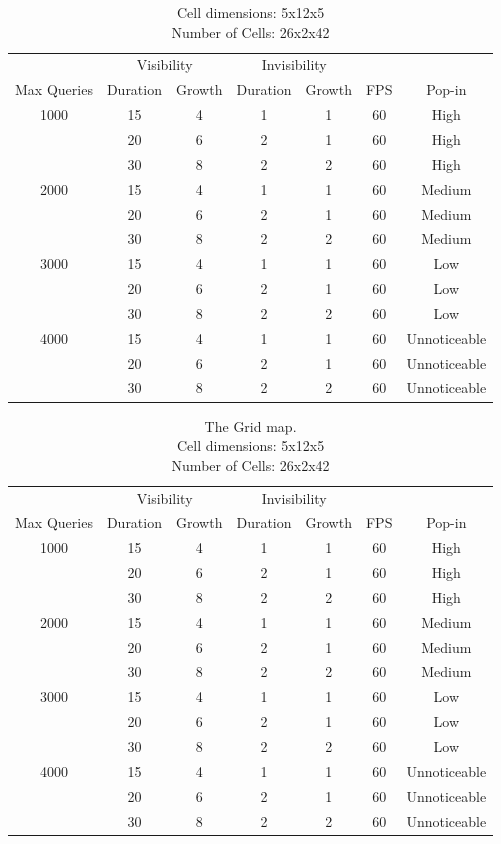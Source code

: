 \documentclass[12pt]{ucthesis}
\newcommand{\captionfonts}{\small\bf\ssp}
\begin{document}
\begin{table}
\begin{center}
\begin{tabular}{|c|c|c|c|c|c|c|}
\hline 
&\multicolumn{2}{c|}{Visibility}&\multicolumn{2}{c|}{Invisibility}&&
\tabularnewline
Max Queries&Duration&Growth&Duration&Growth&FPS&Pop-in
\tabularnewline
\hline
1000 & 15& 4& 1& 1& 60& High
\tabularnewline
& 20& 6& 2& 1& 60& High
\tabularnewline
& 30& 8& 2& 2& 60& High
\tabularnewline \hline
2000 & 15& 4& 1& 1& 60& Medium
\tabularnewline
& 20& 6& 2& 1& 60& Medium
\tabularnewline
& 30& 8& 2& 2& 60& Medium
\tabularnewline \hline
3000 & 15& 4& 1& 1& 60& Low
\tabularnewline
& 20& 6& 2& 1& 60& Low
\tabularnewline
& 30& 8& 2& 2& 60& Low
\tabularnewline \hline 
4000 & 15& 4& 1& 1& 60& Unnoticeable
\tabularnewline 
& 20& 6& 2& 1& 60& Unnoticeable
\tabularnewline
& 30& 8& 2& 2& 60& Unnoticeable
\tabularnewline \hline 
\end{tabular}
\captionfonts
\caption[Performance for The Grid]{Cell dimensions: 5x12x5\\Number of Cells: 26x2x42}
\label{table:the-grid-performance-a}
\end{center}
\end{table}

\begin{table}
\begin{center}
\begin{tabular}{|c|c|c|c|c|c|c|}
\hline 
&\multicolumn{2}{c|}{Visibility}&\multicolumn{2}{c|}{Invisibility}&&
\tabularnewline
Max Queries&Duration&Growth&Duration&Growth&FPS&Pop-in
\tabularnewline
\hline
1000 & 15& 4& 1& 1& 60& High
\tabularnewline
& 20& 6& 2& 1& 60& High
\tabularnewline
& 30& 8& 2& 2& 60& High
\tabularnewline \hline
2000 & 15& 4& 1& 1& 60& Medium
\tabularnewline
& 20& 6& 2& 1& 60& Medium
\tabularnewline
& 30& 8& 2& 2& 60& Medium
\tabularnewline \hline
3000 & 15& 4& 1& 1& 60& Low
\tabularnewline
& 20& 6& 2& 1& 60& Low
\tabularnewline
& 30& 8& 2& 2& 60& Low
\tabularnewline \hline 
4000 & 15& 4& 1& 1& 60& Unnoticeable
\tabularnewline 
& 20& 6& 2& 1& 60& Unnoticeable
\tabularnewline
& 30& 8& 2& 2& 60& Unnoticeable
\tabularnewline \hline 
\end{tabular}
\captionfonts
\caption[Performance for The Grid]{The Grid map.\\Cell dimensions: 5x12x5\\Number of Cells: 26x2x42}
\label{table:the-grid-performance-b}
\end{center}
\end{table}
\end{document}
